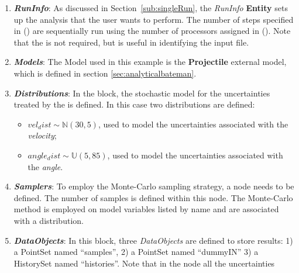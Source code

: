 \begin{enumerate}
   \item \textbf{\textit{RunInfo}}:
     As discussed in Section~\ref{sub:singleRun}, the \textit{RunInfo} \textbf{Entity} sets up the analysis
     that the user wants to perform. The number of steps specified in () are sequentially run using the number of processors assigned in (). 
     Note that the  is not required, but is useful in identifying the input file.
   \item \textbf{\textit{Models}}:
     The Model used in this example is the \textbf{Projectile} external model, which is defined in section \ref{sec:analyticalbateman}.  
   \item \textbf{\textit{Distributions}}:
     In the  block, the stochastic model for the uncertainties treated by the
      is defined. In this case two distributions are defined:
  \begin{itemize}
    \item $vel_dist \sim \mathbb{N}(30,5)$, used to model the uncertainties
    associated with  the \textit{velocity};
    \item  $angle_dist \sim \mathbb{U}(5,85)$,  used to
    model the uncertainties associated with the \textit{angle}.
  \end{itemize}
   \item \textbf{\textit{Samplers}}:
      To employ the Monte-Carlo sampling strategy, a
       node needs to be defined. The number of samples is defined within this node. The Monte-Carlo method is employed on model variables listed by name and are associated with a distribution.
   \item \textbf{\textit{DataObjects}}:
      In this block, three \textit{DataObjects} are defined to store results: 1) a PointSet named
      ``samples'', 2) a PointSet named ``dummyIN'' 3) a HistorySet named ``histories''.
      Note that in the  node all the uncertainties

\end{enumerate}
